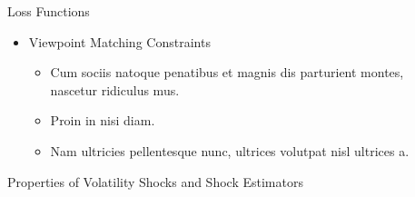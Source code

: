\documentclass{beamer} %
\begin{document}
\begin{frame}[t]
\begin{columns}[t]
\begin{column}{0.465\textwidth}
\begin{block}{Loss Functions}
\begin{itemize}
		\item Viewpoint Matching Constraints
		\begin{itemize}
			\item Cum sociis natoque penatibus et magnis dis parturient montes, nascetur ridiculus mus. 
			\item Proin in nisi diam.
			\item Nam ultricies pellentesque nunc, ultrices volutpat nisl ultrices a.
		\end{itemize}
	\end{itemize}
\end{block}


\begin{block}{Properties of Volatility Shocks and Shock Estimators}

\end{block}


\end{column} %

\begin{column}{0.03\textwidth}\end{column} %
 

\end{columns}
\end{frame}
\end{document}
